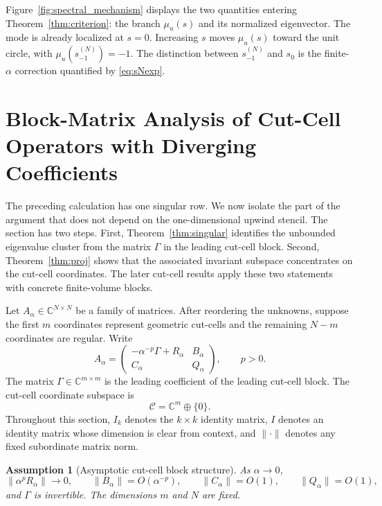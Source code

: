 \documentclass[preprint,12pt]{elsarticle}
\newtheorem{assumption}[theorem]{Assumption}
\begin{document}
Figure~\ref{fig:spectral_mechanism} displays the two quantities entering
Theorem~\ref{thm:criterion}: the branch $\mu_u(s)$ and its normalized
eigenvector.  The mode is already localized at $s=0$.  Increasing $s$ moves
$\mu_u(s)$ toward the unit circle, with
$\mu_u(s_{-1}^{(N)})=-1$.  The distinction between
$s_{-1}^{(N)}$ and $s_0$ is the finite-$\alpha$ correction quantified by
\eqref{eq:sNexp}.

\section{Block-Matrix Analysis of Cut-Cell Operators with Diverging Coefficients}
\label{sec:singular}

The preceding calculation has one singular row.  We now isolate the part of
the argument that does not depend on the one-dimensional upwind stencil.
The section has two steps.  First, Theorem~\ref{thm:singular} identifies the
unbounded eigenvalue cluster from the matrix $\Gamma$ in the leading cut-cell block.
Second, Theorem~\ref{thm:proj} shows that the associated invariant subspace
concentrates on the cut-cell coordinates.  The later cut-cell results apply
these two statements with concrete finite-volume blocks.

Let $A_\alpha\in\mathbb C^{N\times N}$ be a family of matrices.  After
reordering the unknowns, suppose the first $m$ coordinates represent geometric
cut-cells and the remaining $N-m$ coordinates are regular.  Write
\begin{equation}
 A_\alpha
 =
 \begin{pmatrix}
     -\alpha^{-p}\Gamma+R_\alpha & B_\alpha\\
     C_\alpha & Q_\alpha
 \end{pmatrix},
 \qquad p>0.
 \label{eq:singular_block}
\end{equation}
The matrix $\Gamma\in\mathbb C^{m\times m}$ is the leading coefficient
of the leading cut-cell block.  The cut-cell coordinate subspace is
\[
    \mathcal C=\mathbb C^m\oplus\{0\}.
\]
Throughout this section, $I_k$ denotes the $k\times k$ identity matrix,
$I$ denotes an identity matrix whose dimension is clear from context, and
$\|\cdot\|$ denotes any fixed subordinate matrix norm.

\begin{assumption}[Asymptotic cut-cell block structure]
\label{ass:sb}
As $\alpha\to0$,
\[
    \|\alpha^pR_\alpha\|\to0,\qquad
    \|B_\alpha\|=O(\alpha^{-p}),\qquad
    \|C_\alpha\|=O(1),\qquad
    \|Q_\alpha\|=O(1),
\]
and $\Gamma$ is invertible.  The dimensions $m$ and $N$ are fixed.
\end{assumption}
\end{document}
